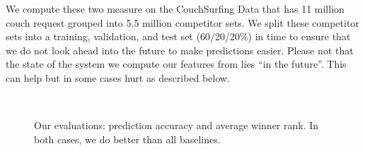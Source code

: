 We compute these two measure on the CouchSurfing Data that has 11 million couch request grouped into 5.5 million competitor sets. We split these competitor sets into a training, validation, and test set (60/20/20\%) in time to ensure that we do not look ahead into the future to make predictions easier. Please not that the state of the system we compute our features from lies ``in the future''. This can help but in some cases hurt as described below.

\begin{figure}[ht]
\centering
{}\\
\caption{Our evaluations: prediction accuracy and average winner rank. In both cases, we do better than all baselines.}
\label{fig:eval}
\end{figure}

